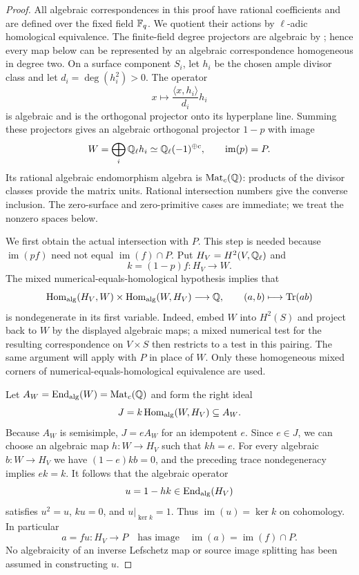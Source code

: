 \begin{proof}
All algebraic correspondences in this proof have rational coefficients
and are defined over the fixed field $\mathbb F_q$. We quotient their actions
by $\ell$-adic homological equivalence. The finite-field degree
projectors are algebraic by
\citet[Theorem~2(1), pp.~76--77]{c_katzmessing1974}; hence every map
below can be represented by an algebraic correspondence homogeneous
in degree two. On a surface component $S_i$, let $h_i$ be the chosen
ample divisor class and let $d_i=\deg(h_i^2)>0$. The operator
\[
 x\longmapsto \frac{\langle x,h_i\rangle}{d_i}h_i
\]
is algebraic and is the orthogonal projector onto its hyperplane line.
Summing these projectors gives an algebraic orthogonal projector
$1-p$ with image
\[
 W=\bigoplus_i\mathbb Q_\ell h_i\simeq\mathbb Q_\ell(-1)^{\oplus c},
 \qquad\operatorname{im}(p)=P.
\]
Its rational algebraic endomorphism algebra is
$\operatorname{Mat}_c(\mathbb Q)$: products of the divisor classes provide
the matrix units. Rational intersection numbers give the converse
inclusion. The zero-surface and zero-primitive cases are immediate;
we treat the nonzero spaces below.

We first obtain the actual intersection with $P$. This step is needed
because $\operatorname{im}(pf)$ need not equal
$\operatorname{im}(f)\cap P$. Put $H_V=H^2(V,\mathbb Q_\ell)$ and
\[
 k=(1-p)f:H_V\longrightarrow W.
\]
The mixed numerical-equals-homological hypothesis implies that
\[
 \operatorname{Hom}_{\rm alg}(H_V,W)\times\operatorname{Hom}_{\rm alg}(W,H_V)
 \longrightarrow\mathbb Q,\qquad (a,b)\longmapsto\operatorname{Tr}(ab)
\]
is nondegenerate in its first variable. Indeed, embed $W$ into $H^2(S)$
and project back to $W$ by the displayed algebraic maps; a mixed
numerical test for the resulting correspondence on $V\times S$
then restricts to a test in this pairing. The same argument will
apply with $P$ in place of $W$. Only these homogeneous mixed corners
of numerical-equals-homological equivalence are used.

Let $A_W=\operatorname{End}_{\rm alg}(W)=\operatorname{Mat}_c(\mathbb Q)$ and form the
right ideal
\[
 J=k\operatorname{Hom}_{\rm alg}(W,H_V)\subseteq A_W.
\]
Because $A_W$ is semisimple, $J=eA_W$ for an idempotent $e$. Since
$e\in J$, we can choose an algebraic map $h:W\to H_V$ such that
$kh=e$. For every algebraic $b:W\to H_V$ we have
$(1-e)kb=0$, and the preceding trace nondegeneracy implies $ek=k$.
It follows that the algebraic operator
\[
 u=1-hk\in\operatorname{End}_{\rm alg}(H_V)
\]
satisfies $u^2=u$, $ku=0$, and $u|_{\ker k}=1$. Thus
$\operatorname{im}(u)=\ker k$ on cohomology. In particular
\[
 a=fu:H_V\longrightarrow P
 \quad\text{has image}\quad
 \operatorname{im}(a)=\operatorname{im}(f)\cap P.
\]
No algebraicity of an inverse Lefschetz map or source image splitting
has been assumed in constructing $u$.


\end{proof}
